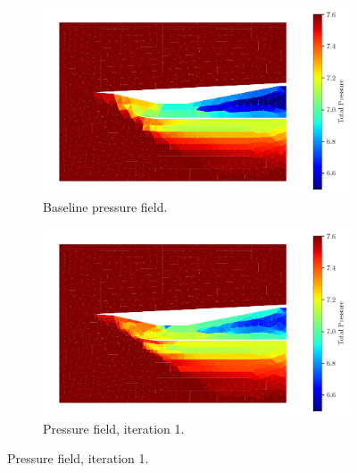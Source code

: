 \pagebreak
\begin{figure}[h!]\ContinuedFloat
    \centering
    \begin{subfigure}[h]{0.49\linewidth}
        \centering
        \includegraphics[width=\linewidth]{rep/q4/Pfield0.pdf}
        \caption{Baseline pressure field.}
    \end{subfigure}
    \begin{subfigure}[h]{0.49\linewidth}
        \centering
        \includegraphics[width=\linewidth]{rep/q4/Pfield1.pdf}
        \caption{Pressure field, iteration 1.}
    \end{subfigure}


\end{figure}

